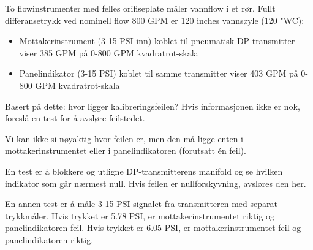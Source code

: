 

To flowinstrumenter med felles orifiseplate måler vannflow i et rør. Fullt differansetrykk ved nominell flow 800 GPM er 120 inches vannsøyle (120 "WC):

\vskip 10pt

\begin{itemize}
\item{} Mottakerinstrument (3-15 PSI inn) koblet til pneumatisk DP-transmitter viser 385 GPM på 0-800 GPM kvadratrot-skala
\vskip 10pt
\item{} Panelindikator (3-15 PSI) koblet til samme transmitter viser 403 GPM på 0-800 GPM kvadratrot-skala
\end{itemize}

\vskip 10pt

Basert på dette: hvor ligger kalibreringsfeilen? Hvis informasjonen ikke er nok, foreslå en test for å avsløre feilstedet.







Vi kan ikke si nøyaktig hvor feilen er, men den må ligge enten i mottakerinstrumentet eller i panelindikatoren (forutsatt én feil).

\vskip 10pt

En test er å blokkere og utligne DP-transmitterens manifold og se hvilken indikator som går nærmest null. Hvis feilen er nullforskyvning, avsløres den her.

\vskip 10pt

En annen test er å måle 3-15 PSI-signalet fra transmitteren med separat trykkmåler. Hvis trykket er 5.78 PSI, er mottakerinstrumentet riktig og panelindikatoren feil. Hvis trykket er 6.05 PSI, er mottakerinstrumentet feil og panelindikatoren riktig.









